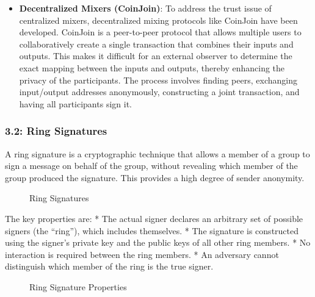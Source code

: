 \begin{itemize}
\tightlist
\item
  \textbf{Decentralized Mixers (CoinJoin)}: To address the trust issue
  of centralized mixers, decentralized mixing protocols like CoinJoin
  have been developed. CoinJoin is a peer-to-peer protocol that allows
  multiple users to collaboratively create a single transaction that
  combines their inputs and outputs. This makes it difficult for an
  external observer to determine the exact mapping between the inputs
  and outputs, thereby enhancing the privacy of the participants. The
  process involves finding peers, exchanging input/output addresses
  anonymously, constructing a joint transaction, and having all
  participants sign it.
\end{itemize}


\subsubsection{3.2: Ring Signatures}\label{ring-signatures}

A ring signature is a cryptographic technique that allows a member of a
group to sign a message on behalf of the group, without revealing which
member of the group produced the signature. This provides a high degree
of sender anonymity.

\begin{figure}
\centering
\caption{Ring Signatures}
\end{figure}

The key properties are: * The actual signer declares an arbitrary set of
possible signers (the ``ring''), which includes themselves. * The
signature is constructed using the signer's private key and the public
keys of all other ring members. * No interaction is required between the
ring members. * An adversary cannot distinguish which member of the ring
is the true signer.

\begin{figure}
\centering
\caption{Ring Signature Properties}
\end{figure}

